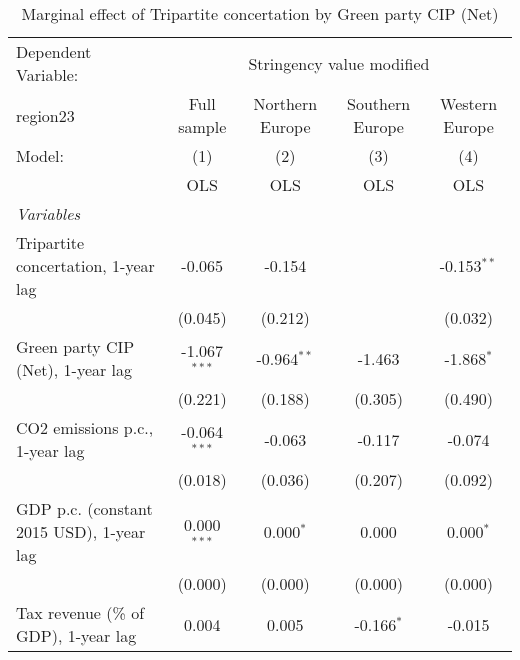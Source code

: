 
\begin{table}[htbp]
   \caption{Marginal effect of Tripartite concertation by Green party CIP (Net)}
   \centering
   \begin{tabular}{lcccc}
      \toprule
      Dependent Variable: & \multicolumn{4}{c}{Stringency value modified}\\
      region23                                                                & Full sample    & Northern Europe & Southern Europe & Western Europe \\   
      Model:                                                                  & (1)            & (2)             & (3)             & (4)\\  
                                                                              &  OLS           & OLS             & OLS             & OLS\\  
      \midrule
      \emph{Variables}\\
      Tripartite concertation, 1-year lag                                     & -0.065         & -0.154          &                 & -0.153$^{**}$\\   
                                                                              & (0.045)        & (0.212)         &                 & (0.032)\\   
      Green party CIP (Net), 1-year lag                                       & -1.067$^{***}$ & -0.964$^{**}$   & -1.463          & -1.868$^{*}$\\   
                                                                              & (0.221)        & (0.188)         & (0.305)         & (0.490)\\   
      CO2 emissions p.c., 1-year lag                                          & -0.064$^{***}$ & -0.063          & -0.117          & -0.074\\   
                                                                              & (0.018)        & (0.036)         & (0.207)         & (0.092)\\   
      GDP p.c. (constant 2015 USD), 1-year lag                                & 0.000$^{***}$  & 0.000$^{*}$     & 0.000           & 0.000$^{*}$\\   
                                                                              & (0.000)        & (0.000)         & (0.000)         & (0.000)\\   
      Tax revenue (\% of GDP), 1-year lag                                     & 0.004          & 0.005           & -0.166$^{*}$    & -0.015\\   

\end{tabular}
\end{table}
